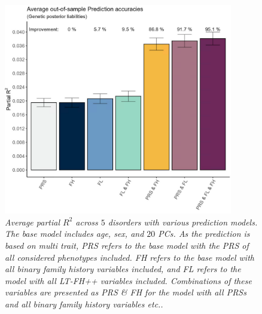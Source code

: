 \begin{figure}
	\includegraphics[width=10cm]{results/avg_partial_prediciton_accuracies_multi_trait.png}
	\caption[Average out of sample prediction for multi trait]{
		\sl Average partial $ R^2 $ across $ 5 $ disorders with various prediction models. The base model includes age, sex, and $ 20 $ PCs. As the prediction is based on multi trait, \textit{PRS} refers to the base model with the PRS of all considered phenotypes included. \textit{FH} refers to the base model with all binary family history variables included, and \textit{FL} refers to the model with all LT-FH++ variables included. Combinations of these variables are presented as \textit{PRS} \& \textit{FH} for the model with all PRSs and all binary family history variables etc..}
	\label{fig:paper3:predictionResultsMultiTrait}
\end{figure}

